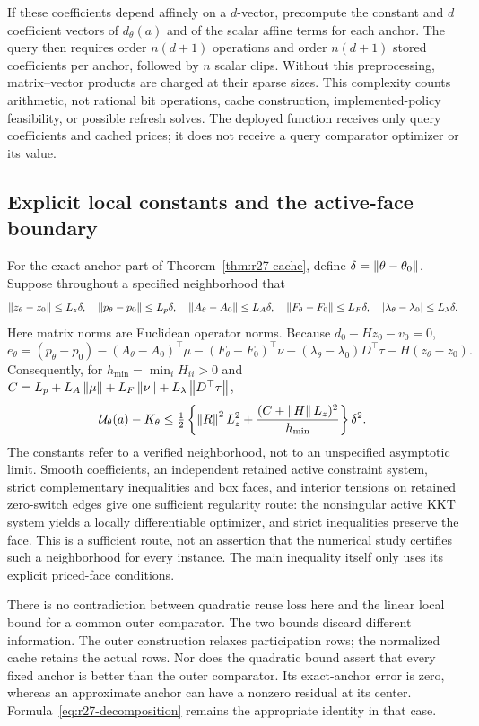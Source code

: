 If these coefficients depend affinely on a $d$-vector, precompute the constant and $d$ coefficient vectors of $d_\theta(a)$ and of the scalar affine terms for each anchor. The query then requires order $n(d+1)$ operations and order $n(d+1)$ stored coefficients per anchor, followed by $n$ scalar clips. Without this preprocessing, matrix--vector products are charged at their sparse sizes. This complexity counts arithmetic, not rational bit operations, cache construction, implemented-policy feasibility, or possible refresh solves. The deployed function receives only query coefficients and cached prices; it does not receive a query comparator optimizer or its value.

\subsection{Explicit local constants and the active-face boundary}
For the exact-anchor part of Theorem~\ref{thm:r27-cache}, define $\delta=\left\lVert\theta-\theta_0\right\rVert$. Suppose throughout a specified neighborhood that
\[
 \left\lVert z_\theta-z_0\right\rVert\leq L_z\delta,
 \quad \left\lVert p_\theta-p_0\right\rVert\leq L_p\delta,
 \quad \left\lVert A_\theta-A_0\right\rVert\leq L_A\delta,
 \quad \left\lVert F_\theta-F_0\right\rVert\leq L_F\delta,
 \quad |\lambda_\theta-\lambda_0|\leq L_\lambda\delta.
\]
Here matrix norms are Euclidean operator norms. Because $d_0-Hz_0-v_0=0$,
\[
 e_\theta=(p_\theta-p_0)-(A_\theta-A_0)^\top\mu
 -(F_\theta-F_0)^\top\nu-(\lambda_\theta-\lambda_0)D^\top\tau-H(z_\theta-z_0).
\]
Consequently, for $h_{\min}=\min_i H_{ii}>0$ and
$C=L_p+L_A\left\lVert\mu\right\rVert+L_F\left\lVert\nu\right\rVert+L_\lambda\left\lVert D^\top\tau\right\rVert$,
\begin{equation}\label{eq:r27-constant}
 \mathcal U_\theta(a)-K_\theta
 \leq\tfrac12\left\{\left\lVert R\right\rVert^2L_z^2+
       \frac{(C+\left\lVert H\right\rVert L_z)^2}{h_{\min}}\right\}\delta^2.
\end{equation}
The constants refer to a verified neighborhood, not to an unspecified asymptotic limit. Smooth coefficients, an independent retained active constraint system, strict complementary inequalities and box faces, and interior tensions on retained zero-switch edges give one sufficient regularity route: the nonsingular active KKT system yields a locally differentiable optimizer, and strict inequalities preserve the face. This is a sufficient route, not an assertion that the numerical study certifies such a neighborhood for every instance. The main inequality itself only uses its explicit priced-face conditions.

There is no contradiction between quadratic reuse loss here and the linear local bound for a common outer comparator. The two bounds discard different information. The outer construction relaxes participation rows; the normalized cache retains the actual rows. Nor does the quadratic bound assert that every fixed anchor is better than the outer comparator. Its exact-anchor error is zero, whereas an approximate anchor can have a nonzero residual at its center. Formula~\eqref{eq:r27-decomposition} remains the appropriate identity in that case.

